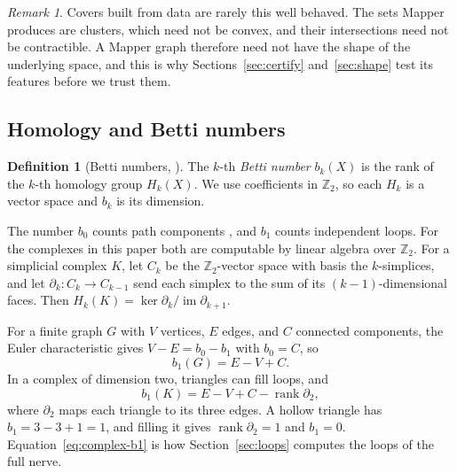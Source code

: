\documentclass{article}
\newcommand{\Z}{\mathbb{Z}}
\DeclareMathOperator{\rank}{rank}
\theoremstyle{definition}
\newtheorem{definition}[theorem]{Definition}
\theoremstyle{remark}
\newtheorem{remark}[theorem]{Remark}
\begin{document}
\begin{remark}
Covers built from data are rarely this well behaved. The sets Mapper produces are clusters, which need not be convex, and their intersections need not be contractible. A Mapper graph therefore need not have the shape of the underlying space, and this is why Sections~\ref{sec:certify} and~\ref{sec:shape} test its features before we trust them.
\end{remark}

\subsection{Homology and Betti numbers}
\begin{definition}[Betti numbers, {\cite{hatcher2001}}]
The $k$-th \emph{Betti number} $b_k(X)$ is the rank of the $k$-th homology group $H_k(X)$. We use coefficients in $\Z_2$, so each $H_k$ is a vector space and $b_k$ is its dimension.
\end{definition}
The number $b_0$ counts path components \parencite{hatcher2001}, and $b_1$ counts independent loops.
For the complexes in this paper both are computable by linear algebra over $\Z_2$.
For a simplicial complex $K$, let $C_k$ be the $\Z_2$-vector space with basis the $k$-simplices, and let $\partial_k : C_k \to C_{k-1}$ send each simplex to the sum of its $(k-1)$-dimensional faces. Then $H_k(K) = \ker \partial_k / \operatorname{im} \partial_{k+1}$.

For a finite graph $G$ with $V$ vertices, $E$ edges, and $C$ connected components, the Euler characteristic gives $V - E = b_0 - b_1$ with $b_0 = C$, so
\begin{equation}\label{eq:graph-b1}
  b_1(G) = E - V + C.
\end{equation}
In a complex of dimension two, triangles can fill loops, and
\begin{equation}\label{eq:complex-b1}
  b_1(K) = E - V + C - \rank \partial_2,
\end{equation}
where $\partial_2$ maps each triangle to its three edges.
A hollow triangle has $b_1 = 3 - 3 + 1 = 1$, and filling it gives $\rank \partial_2 = 1$ and $b_1 = 0$.
Equation~\eqref{eq:complex-b1} is how Section~\ref{sec:loops} computes the loops of the full nerve.
\end{document}
